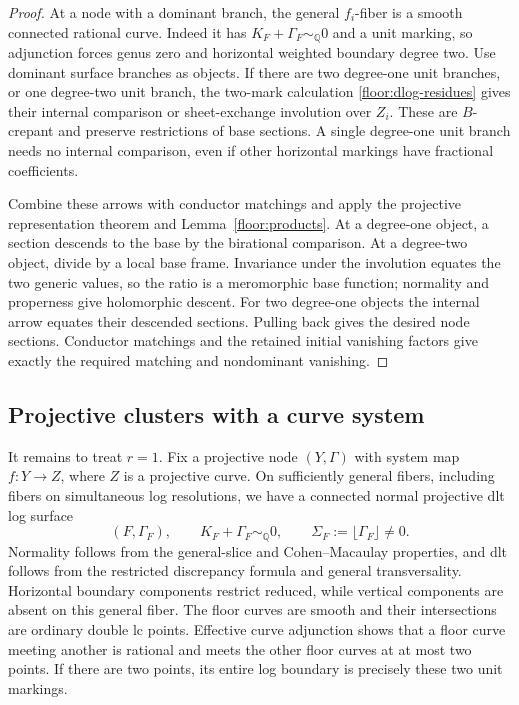 \documentclass[11pt,letterpaper]{article}
\theoremstyle{definition}
\theoremstyle{remark}
\begin{document}
\begin{proof}
At a node with a dominant branch, the general
$f_i$-fiber is a smooth connected rational curve.
Indeed it has
$K_F+\Gamma_F\sim_\mathbb{Q}0$ and a unit marking, so
adjunction forces genus zero and horizontal weighted
boundary degree two.  Use dominant surface branches
as objects.  If there are two degree-one unit
branches, or one degree-two unit branch, the
two-mark calculation
\eqref{floor:dlog-residues} gives their internal
comparison or sheet-exchange involution over $Z_i$.
These are $B$-crepant and preserve restrictions of
base sections.  A single degree-one unit branch
needs no internal comparison, even if other
horizontal markings have fractional coefficients.

Combine these arrows with conductor matchings and
apply the projective representation theorem and
Lemma~\ref{floor:products}.  At a degree-one object,
a section descends to the base by the birational
comparison.  At a degree-two object, divide by a
local base frame.  Invariance under the involution
equates the two generic values, so the ratio is a
meromorphic base function; normality and properness
give holomorphic descent.  For two degree-one
objects the internal arrow equates their descended
sections.  Pulling back gives the desired node
sections.  Conductor matchings and the retained
initial vanishing factors give exactly the required
matching and nondominant vanishing.
\end{proof}

\subsection{Projective clusters with a curve system}

It remains to treat $r=1$.  Fix a projective node
$(Y,\Gamma)$ with system map $f:Y\to Z$, where $Z$
is a projective curve.  On sufficiently general fibers,
including fibers on simultaneous log resolutions, we
have a connected normal projective dlt log surface
\begin{equation}
 \label{floor:surface-fiber}
 (F,\Gamma_F),\qquad
 K_F+\Gamma_F\sim_\mathbb{Q}0,\qquad
 \Sigma_F:=\lfloor\Gamma_F\rfloor\ne0.
\end{equation}
Normality follows from the general-slice and
Cohen--Macaulay properties, and dlt follows from the
restricted discrepancy formula and general
transversality.  Horizontal boundary components
restrict reduced, while vertical components are
absent on this general fiber.  The floor curves are
smooth and their intersections are ordinary double
lc points.  Effective curve adjunction shows that a
floor curve meeting another is rational and meets
the other floor curves at at most two points.  If
there are two points, its entire log boundary is
precisely these two unit markings.
\end{document}
